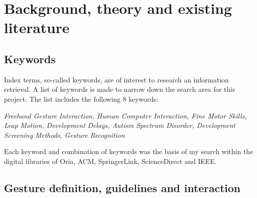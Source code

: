 \chapter{Background, theory and existing literature}
\label{chap:background}


\section{Keywords}
\label{sec:keywords}
Index terms, so-called keywords, are of interest to research an information retrieval. A list of keywords is made to narrow down the search area for this project. The list includes the following 8 keywords: 
\newline

\textit{Freehand Gesture Interaction, Human Computer Interaction, Fine Motor Skills, Leap Motion, Development Delays, Autism Spectrum Disorder, Development Screening Methods, Gesture Recognition}
\newline

Each keyword and combination of keywords was the basis of my search within the digital libraries of Oria, ACM, SpringerLink, ScienceDirect and IEEE.

  

\section{Gesture definition, guidelines and interaction}
\label{sec:gesture}

